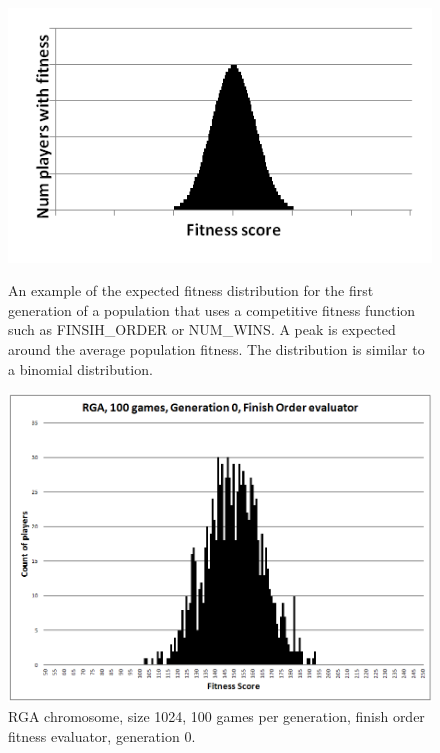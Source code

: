 \begin{figure}
\centering
\begin{minipage}[t]{0.47\linewidth}
\centering
\includegraphics[width=1.0\linewidth]{Figures/binomial.png}
\caption[Binomial Distribution]{An example of the expected fitness distribution
for the first generation of a population that uses a competitive fitness
function such as FINSIH\_ORDER or NUM\_WINS. A peak is expected around the
average population fitness. The distribution is similar to a binomial
distribution.}
\label{figure-binomial}
\end{minipage}%
\hspace{0.06\linewidth}%
\begin{minipage}[t]{0.47\linewidth}
\centering
\includegraphics[width=1.0\linewidth]{Figures/RGA_1024_G000_N100_FO.png}
\caption[RGA Finish Order Fitness Distribution, Initial Generation]{RGA
chromosome, size 1024, 100 games per generation, finish order
fitness evaluator, generation 0.}
\label{figure-RGA-G000-N100-FO-initial_fitness}
\end{minipage}
\end{figure}

